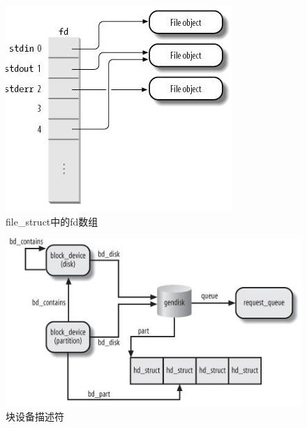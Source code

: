 \begin{figure}[ht]
	\begin{center}
		\includegraphics[keepaspectratio,width=0.3\paperwidth]{Pictures/Kernel/LinuxFdArrayInFileStruct.png}
	\caption{file\_struct中的fd数组}
	\label{fig:LinuxFdArrayInFileStruct}
	\end{center}
\end{figure}


\begin{figure}[ht]
	\begin{center}
		\includegraphics[keepaspectratio,width=0.6\paperwidth]{Pictures/Kernel/BlockDeviceDescriptors.png}
	\caption{块设备描述符}
	\label{fig:BlockDeviceDescriptors}
	\end{center}
\end{figure}













\clearpage

